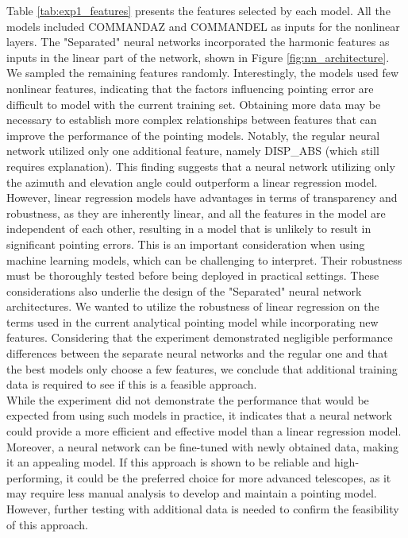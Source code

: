 Table \ref{tab:exp1_features} presents the features selected by each model.
All the models included COMMANDAZ and COMMANDEL as inputs for the nonlinear layers.
The "Separated" neural networks incorporated the harmonic features as inputs in the linear part of the network, shown in Figure \ref{fig:nn_architecture}.
We sampled the remaining features randomly.
Interestingly, the models used few nonlinear features, indicating that the factors influencing pointing error are difficult to model with the current training set.
Obtaining more data may be necessary to establish more complex relationships between features that can improve the performance of the pointing models.
Notably, the regular neural network utilized only one additional feature, namely DISP\_ABS (which still requires explanation).
This finding suggests that a neural network utilizing only the azimuth and elevation angle could outperform a linear regression model.
However, linear regression models have advantages in terms of transparency and robustness, as they are inherently linear, and all the features in the model are independent of each other,
resulting in a model that is unlikely to result in significant pointing errors.
This is an important consideration when using machine learning models, which can be challenging to interpret.
Their robustness must be thoroughly tested before being deployed in practical settings.
These considerations also underlie the design of the "Separated" neural network architectures.
We wanted to utilize the robustness of linear regression on the terms used in the current analytical pointing model while incorporating new features. 
Considering that the experiment demonstrated negligible performance differences between the separate neural networks and the regular
one and that the best models only choose a few features, we conclude that additional training data is required to see if this is a feasible approach.\\

While the experiment did not demonstrate the performance that would be expected from using such models in practice,
it indicates that a neural network could provide a more efficient and effective model than a linear regression model.
Moreover, a neural network can be fine-tuned with newly obtained data, making it an appealing model.
If this approach is shown to be reliable and high-performing, it could be the preferred choice for more advanced telescopes, as it may require less manual analysis to develop and maintain a pointing model.
However, further testing with additional data is needed to confirm the feasibility of this approach.
